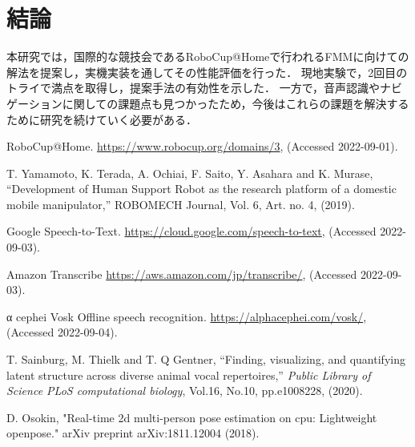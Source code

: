 \documentclass[a4j]{jarticle}
\begin{document}
\section{結論}
本研究では，国際的な競技会であるRoboCup@Homeで行われるFMMに向けての解法を提案し，実機実装を通してその性能評価を行った．
現地実験で，2回目のトライで満点を取得し，提案手法の有効性を示した．
一方で，音声認識やナビゲーションに関しての課題点も見つかったため，今後はこれらの課題を解決するために研究を続けていく必要がある．

\begin{thebibliography}{99}

RoboCup@Home. \url{https://www.robocup.org/domains/3}, (Accessed 2022-09-01).

T. Yamamoto, K. Terada, A. Ochiai, F. Saito, Y. Asahara and K. Murase, “Development of Human Support Robot as the research platform of a domestic mobile manipulator,” ROBOMECH Journal, Vol. 6, Art. no. 4, (2019).




Google Speech-to-Text. \url{https://cloud.google.com/speech-to-text}, (Accessed 2022-09-03).

Amazon Transcribe \url{https://aws.amazon.com/jp/transcribe/}, (Accessed 2022-09-03).

α cephei Vosk Offline speech recognition. \url{https://alphacephei.com/vosk/}, (Accessed 2022-09-04).

T. Sainburg, M. Thielk and T. Q Gentner,
“Finding, visualizing, and quantifying latent structure across diverse animal vocal repertoires,”
{\it Public Library of Science PLoS computational biology},
Vol.16,
No.10,
pp.e1008228,
(2020).

D. Osokin, "Real-time 2d multi-person pose estimation on cpu: Lightweight openpose." arXiv preprint arXiv:1811.12004 (2018).


\end{thebibliography}
\end{document}
